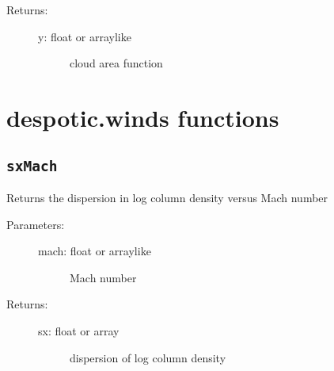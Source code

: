 \documentclass[letterpaper,10pt,english]{sphinxmanual}
\begin{document}
\begin{fulllineitems}
\begin{fulllineitems}
\begin{description}
\begin{description}
\end{description}

\item[{Returns:}] \leavevmode\begin{description}
\item[{y: float or arraylike}] \leavevmode
cloud area function

\end{description}

\end{description}

\end{fulllineitems}


\end{fulllineitems}



\section{despotic.winds functions}
\label{fulldoc:despotic-winds-functions}

\subsection{\texttt{sxMach}}
\label{fulldoc:sxmach}

\begin{fulllineitems}
\label{fulldoc:despotic.winds.pwind_util.sxMach}
Returns the dispersion in log column density versus Mach number
\begin{description}
\item[{Parameters:}] \leavevmode\begin{description}
\item[{mach: float or arraylike}] \leavevmode
Mach number

\end{description}

\item[{Returns:}] \leavevmode\begin{description}
\item[{sx: float or array}] \leavevmode
dispersion of log column density

\end{description}

\end{description}

\end{fulllineitems}
\end{document}
